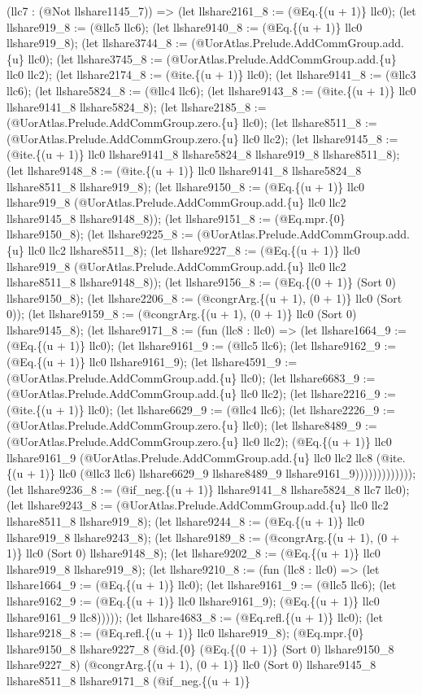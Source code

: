 \documentclass[11pt]{article}
\begin{document}
(llc7 : (@Not llshare1145\_7)) => (let llshare2161\_8 := (@Eq.\{(u + 1)\} llc0); (let llshare919\_8 := (@llc5 llc6); (let llshare9140\_8 := (@Eq.\{(u + 1)\} llc0 llshare919\_8); (let llshare3744\_8 := (@UorAtlas.Prelude.AddCommGroup.add.\{u\} llc0); (let llshare3745\_8 := (@UorAtlas.Prelude.AddCommGroup.add.\{u\} llc0 llc2); (let llshare2174\_8 := (@ite.\{(u + 1)\} llc0); (let llshare9141\_8 := (@llc3 llc6); (let llshare5824\_8 := (@llc4 llc6); (let llshare9143\_8 := (@ite.\{(u + 1)\} llc0 llshare9141\_8 llshare5824\_8); (let llshare2185\_8 := (@UorAtlas.Prelude.AddCommGroup.zero.\{u\} llc0); (let llshare8511\_8 := (@UorAtlas.Prelude.AddCommGroup.zero.\{u\} llc0 llc2); (let llshare9145\_8 := (@ite.\{(u + 1)\} llc0 llshare9141\_8 llshare5824\_8 llshare919\_8 llshare8511\_8); (let llshare9148\_8 := (@ite.\{(u + 1)\} llc0 llshare9141\_8 llshare5824\_8 llshare8511\_8 llshare919\_8); (let llshare9150\_8 := (@Eq.\{(u + 1)\} llc0 llshare919\_8 (@UorAtlas.Prelude.AddCommGroup.add.\{u\} llc0 llc2 llshare9145\_8 llshare9148\_8)); (let llshare9151\_8 := (@Eq.mpr.\{0\} llshare9150\_8); (let llshare9225\_8 := (@UorAtlas.Prelude.AddCommGroup.add.\{u\} llc0 llc2 llshare8511\_8); (let llshare9227\_8 := (@Eq.\{(u + 1)\} llc0 llshare919\_8 (@UorAtlas.Prelude.AddCommGroup.add.\{u\} llc0 llc2 llshare8511\_8 llshare9148\_8)); (let llshare9156\_8 := (@Eq.\{(0 + 1)\} (Sort 0) llshare9150\_8); (let llshare2206\_8 := (@congrArg.\{(u + 1), (0 + 1)\} llc0 (Sort 0)); (let llshare9159\_8 := (@congrArg.\{(u + 1), (0 + 1)\} llc0 (Sort 0) llshare9145\_8); (let llshare9171\_8 := (fun (llc8 : llc0) => (let llshare1664\_9 := (@Eq.\{(u + 1)\} llc0); (let llshare9161\_9 := (@llc5 llc6); (let llshare9162\_9 := (@Eq.\{(u + 1)\} llc0 llshare9161\_9); (let llshare4591\_9 := (@UorAtlas.Prelude.AddCommGroup.add.\{u\} llc0); (let llshare6683\_9 := (@UorAtlas.Prelude.AddCommGroup.add.\{u\} llc0 llc2); (let llshare2216\_9 := (@ite.\{(u + 1)\} llc0); (let llshare6629\_9 := (@llc4 llc6); (let llshare2226\_9 := (@UorAtlas.Prelude.AddCommGroup.zero.\{u\} llc0); (let llshare8489\_9 := (@UorAtlas.Prelude.AddCommGroup.zero.\{u\} llc0 llc2); (@Eq.\{(u + 1)\} llc0 llshare9161\_9 (@UorAtlas.Prelude.AddCommGroup.add.\{u\} llc0 llc2 llc8 (@ite.\{(u + 1)\} llc0 (@llc3 llc6) llshare6629\_9 llshare8489\_9 llshare9161\_9))))))))))))); (let llshare9236\_8 := (@if\_neg.\{(u + 1)\} llshare9141\_8 llshare5824\_8 llc7 llc0); (let llshare9243\_8 := (@UorAtlas.Prelude.AddCommGroup.add.\{u\} llc0 llc2 llshare8511\_8 llshare919\_8); (let llshare9244\_8 := (@Eq.\{(u + 1)\} llc0 llshare919\_8 llshare9243\_8); (let llshare9189\_8 := (@congrArg.\{(u + 1), (0 + 1)\} llc0 (Sort 0) llshare9148\_8); (let llshare9202\_8 := (@Eq.\{(u + 1)\} llc0 llshare919\_8 llshare919\_8); (let llshare9210\_8 := (fun (llc8 : llc0) => (let llshare1664\_9 := (@Eq.\{(u + 1)\} llc0); (let llshare9161\_9 := (@llc5 llc6); (let llshare9162\_9 := (@Eq.\{(u + 1)\} llc0 llshare9161\_9); (@Eq.\{(u + 1)\} llc0 llshare9161\_9 llc8))))); (let llshare4683\_8 := (@Eq.refl.\{(u + 1)\} llc0); (let llshare9218\_8 := (@Eq.refl.\{(u + 1)\} llc0 llshare919\_8); (@Eq.mpr.\{0\} llshare9150\_8 llshare9227\_8 (@id.\{0\} (@Eq.\{(0 + 1)\} (Sort 0) llshare9150\_8 llshare9227\_8) (@congrArg.\{(u + 1), (0 + 1)\} llc0 (Sort 0) llshare9145\_8 llshare8511\_8 llshare9171\_8 (@if\_neg.\{(u + 1)\} 
\end{document}
